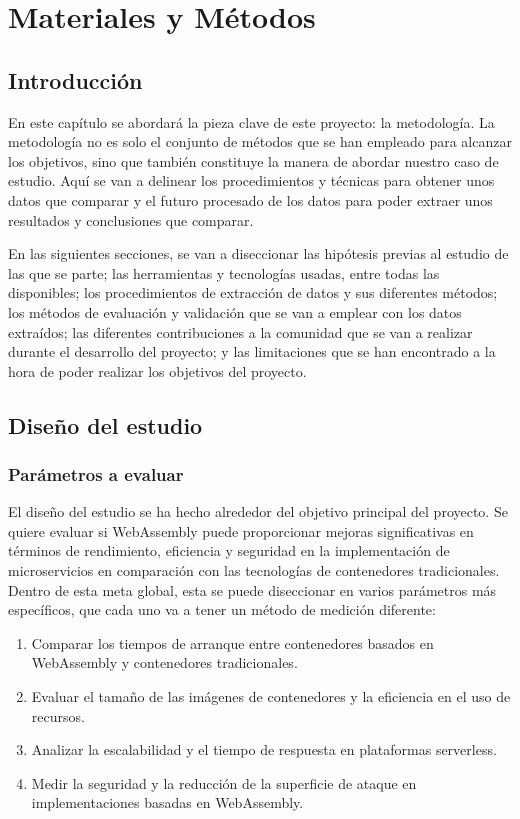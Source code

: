 \chapter{Materiales y Métodos}
\label{ch:metodología}

\section{Introducción}

En este capítulo se abordará la pieza clave de este proyecto: la metodología. La metodología no es solo el conjunto de métodos que se han empleado para alcanzar los objetivos, sino que también constituye la manera de abordar nuestro caso de estudio. Aquí se van a delinear los procedimientos y técnicas para obtener unos datos que comparar y el futuro procesado de los datos para poder extraer unos resultados y conclusiones que comparar.

En las siguientes secciones, se van a diseccionar las hipótesis previas al estudio de las que se parte; las herramientas y tecnologías usadas, entre todas las disponibles; los procedimientos de extracción de datos y sus diferentes métodos; los métodos de evaluación y validación que se van a emplear con los datos extraídos; las diferentes contribuciones a la comunidad que se van a realizar durante el desarrollo del proyecto; y las limitaciones que se han encontrado a la hora de poder realizar los objetivos del proyecto.

\section{Diseño del estudio}

\subsection{Parámetros a evaluar}

El diseño del estudio se ha hecho alrededor del objetivo principal del proyecto. Se quiere evaluar si WebAssembly puede proporcionar mejoras significativas en términos de rendimiento, eficiencia y seguridad en la implementación de microservicios en comparación con las tecnologías de contenedores tradicionales. Dentro de esta meta global, esta se puede diseccionar en varios parámetros más específicos, que cada uno va a tener un método de medición diferente:

\begin{enumerate}
    \item Comparar los tiempos de arranque entre contenedores basados en WebAssembly y contenedores tradicionales.
    \item Evaluar el tamaño de las imágenes de contenedores y la eficiencia en el uso de recursos.
    \item Analizar la escalabilidad y el tiempo de respuesta en plataformas serverless.
    \item Medir la seguridad y la reducción de la superficie de ataque en implementaciones basadas en WebAssembly.
\end{enumerate}

